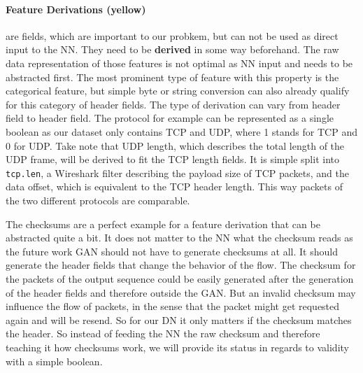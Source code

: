 \documentclass[
	ngerman,
	ruledheaders=section,%
	class=report,%
	thesis={type=bachelor},%
	accentcolor=9c,%
	custommargins=true,%
	marginpar=false,%
	parskip=half-,%
	fontsize=11pt,%
]{tudapub}
\let\code\texttt
\begin{document}
\paragraph{\colorbox{derivation}{\textbf{Feature Derivations} (yellow)}} are fields, which are important to our probkem, but can not be used as direct input to the NN.
They need to be \textbf{derived} in some way beforehand.
The raw data representation of those features is not optimal as NN input and needs to be abstracted first.
The most prominent type of feature with this property is the categorical feature, but simple byte or string conversion can also already qualify for this category of header fields.
The type of derivation can vary from header field to header field.
The protocol for example can be represented as a single boolean as our dataset only contains TCP and UDP, where 1 stands for TCP and 0 for UDP.
Take note that UDP length, which describes the total length of the UDP frame, will be derived to fit the TCP length fields.
It is simple split into \code{tcp.len}, a Wireshark filter describing the payload size of TCP packets, and the data offset, which is equivalent to the TCP header length.
This way packets of the two different protocols are comparable.

The checksums are a perfect example for a feature derivation that can be abstracted quite a bit.
It does not matter to the NN what the checksum reads as the future work GAN should not have to generate checksums at all.
It should generate the header fields that change the behavior of the flow.
The checksum for the packets of the output sequence could be easily generated after the generation of the header fields and therefore outside the GAN.
But an invalid checksum may influence the flow of packets, in the sense that the packet might get requested again and will be resend.
So for our DN it only matters if the checksum matches the header.
So instead of feeding the NN the raw checksum and therefore teaching it how checksums work, we will provide its status in regards to validity with a simple boolean.
\end{document}
